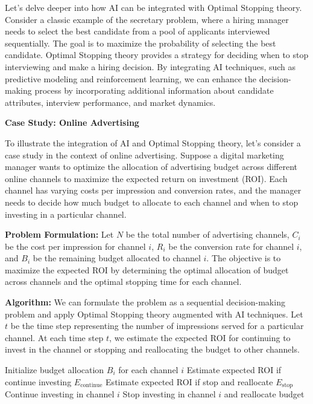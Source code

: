 \documentclass[12pt]{book} %
\begin{document}
Let's delve deeper into how AI can be integrated with Optimal Stopping theory. Consider a classic example of the secretary problem, where a hiring manager needs to select the best candidate from a pool of applicants interviewed sequentially. The goal is to maximize the probability of selecting the best candidate. Optimal Stopping theory provides a strategy for deciding when to stop interviewing and make a hiring decision. By integrating AI techniques, such as predictive modeling and reinforcement learning, we can enhance the decision-making process by incorporating additional information about candidate attributes, interview performance, and market dynamics.

\textbf{Case Study: Online Advertising}

To illustrate the integration of AI and Optimal Stopping theory, let's consider a case study in the context of online advertising. Suppose a digital marketing manager wants to optimize the allocation of advertising budget across different online channels to maximize the expected return on investment (ROI). Each channel has varying costs per impression and conversion rates, and the manager needs to decide how much budget to allocate to each channel and when to stop investing in a particular channel.

\textbf{Problem Formulation:}
Let \(N\) be the total number of advertising channels, \(C_i\) be the cost per impression for channel \(i\), \(R_i\) be the conversion rate for channel \(i\), and \(B_i\) be the remaining budget allocated to channel \(i\). The objective is to maximize the expected ROI by determining the optimal allocation of budget across channels and the optimal stopping time for each channel.

\textbf{Algorithm:}
We can formulate the problem as a sequential decision-making problem and apply Optimal Stopping theory augmented with AI techniques. Let \(t\) be the time step representing the number of impressions served for a particular channel. At each time step \(t\), we estimate the expected ROI for continuing to invest in the channel or stopping and reallocating the budget to other channels.
\FloatBarrier
\begin{algorithm}
\caption{AI-Optimal Stopping Algorithm for Online Advertising}
\begin{algorithmic}[1]
\State Initialize budget allocation $B_i$ for each channel $i$
        \State Estimate expected ROI if continue investing $E_{\text{continue}}$
        \State Estimate expected ROI if stop and reallocate $E_{\text{stop}}$
            \State Continue investing in channel $i$
        \Else
            \State Stop investing in channel $i$ and reallocate budget
        \EndIf
    \EndFor
\EndFor
\end{algorithmic}
\end{algorithm}
\FloatBarrier
\end{document}
